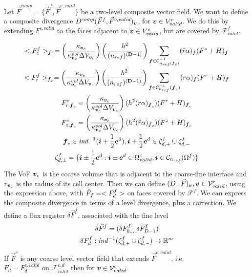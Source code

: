 Let $\vec{F}^{comp} = \{ \vec{F}^f, \vec{F}^{c, valid} \}$ be a
two-level composite vector field. We want to define a composite
divergence $D^{comp}(\vec{F}^f, \vec{F}^{c, valid})_{\boldsymbol{v}}$, for
${\boldsymbol{v}} \in V^c_{valid}$. We do this by extending $F^{c, valid}$ to
the faces adjacent to ${\boldsymbol{v}} \in V^c_{valid}$, but are covered by
$\mathcal{F}^f_{valid}$. 

\newcommand{\bigfrac}{\left(\frac{\kappa_{\vbold_c}}{\kappa^{vol}_{\vbold_c}\Delta
    V_{\vbold_c}}\right)}

\begin{gather*}
<F^f_z>_{\fbold_c} = \bigfrac
\left(\frac{h^2 }{(n_{ref})^{(\Dim-1)}}\right) 
\sum\limits_{\fbold \in \mathcal{C}^{-1}_{n_{ref}(\fbold_c)}} 
(\bar{r} \alpha)_\fbold (\bar{F}^z + \bar{H})_\fbold \\ 
<F^f_r>_{\fbold_c} = \bigfrac
\left( \frac{h^2}{(n_{ref})^{(\Dim-1)}} \right)
\sum\limits_{\fbold \in \mathcal{C}^{-1}_{n_{ref}}
(\fbold_c)}(r \alpha)_\fbold (F^r + H)_\fbold \\ 
F^c_{r, \fbold_c} =  \bigfrac
(h^2 (r \alpha)_{\fbold_c}) (F^r + H)_{\fbold_c}  \\
F^c_{z, \fbold_c} = \bigfrac
(h^2 (\bar{r} \alpha)_{\fbold_c})  (\bar{F}^z+\bar{H})_{\fbold_c}
\\  
\fbold_c \in \ind^{-1}(\ibold + \half \ebold^d), \ibold + \half
\ebold^d \in \zeta^f_{d, +} \cup \zeta^f_{d, -} \\ 
\zeta^f_{d, \pm} = \{ \ibold \pm \half \ebold^d : \ibold \pm \ebold^d
\in \Omega^c_{valid}, \ibold \in \mathcal{C}_{n_{ref}}(\Omega^f) \}  
\end{gather*}
The VoF ${\boldsymbol{v}}_c$ is the coarse volume that is adjacent to the 
coarse-fine interface and $r_{{\boldsymbol{v}}_c}$ is the radius of its cell
center. Then we can define $(D \cdot \vec{F})_{\boldsymbol{v}},
{\boldsymbol{v}} \in \mathcal{V}^c_{valid}$, using the expression above, with
$\tilde{F}_{\boldsymbol{f}} = <F^f_d>$ on faces covered by $\mathcal{F}^f$. 
We can express the composite divergence in terms of a level
divergence, plus a correction. We define a flux register $\delta
\vec{F}^f$, associated with the fine level 
\begin{gather*}
\delta \vec{F}^f = (\delta F^f_{0, \ldots} \delta F^f_{D-1}) \\
\delta F^f_d : {\it ind}^{-1}(\zeta^f_{d, +} \cup \zeta^f_{d,-}) \rightarrow
\mathbb{R}^m 
\end{gather*}
If $\vec{F}^c$ is any coarse level vector field that extends
$\vec{F}^{c, valid}$, i.e. $F^c_d = F^{c, valid}_d \mbox{ on }
\mathcal{F}^{c,d}_{valid}$ then for ${\boldsymbol{v}} \in \mathcal{V}^c_{valid}$ 

